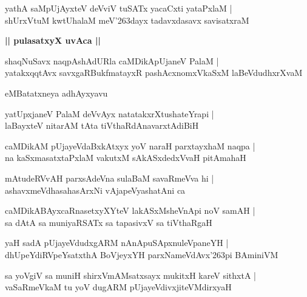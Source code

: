 \documentclass[twoside,12pt,openright]{book}
\def\S{\char'263}
\newcounter{shloka}[chapter]
\def\uvaca#1{\centerline{{\large\textbf{#1}}}}
\begin{document}
\begin{shloka}%
yathA saMpUjAyxteV deVviV tuSATx yacaCxti yataPxlaM |\\
shUrxVtuM kwtUhalaM meV\S dayx tadavxdasavx savisatxraM 
\end{shloka}

\uvaca{|| pulasatxyX uvAca ||}

\begin{shloka}%
shaqNuSavx naqpAshAdURla caMDikApUjaneV PalaM |\\
yatakxqqtAvx savxgaRBukfmatayxR pashAcxnomxVkaSxM laBeVdudhxrXvaM 
\end{shloka}

\begin{center}
eMBatatxneya adhAyxyavu
\end{center}

\begin{shloka}%
yatUpxjaneV PalaM deVvAyx natatakxrXtushateYrapi |\\
laBayxteV nitarAM tAta tiVthaRdAnavarxtAdiBiH 
\end{shloka}

\begin{shloka}%
caMDikAM pUjayeVdaBxkAtxyx yoV naraH parxtayxhaM naqpa |\\
na kaSxmasatxtaPxlaM vakutxM sAkASxdedxVvaH pitAmahaH 
\end{shloka}

\begin{shloka}%
mAtudeRVvAH parxsAdeVna sulaBaM savaRmeVva hi |\\
ashavxmeVdhasahasArxNi vAjapeVyashatAni ca
\end{shloka}

\begin{shloka}%
caMDikABAyxcaRnasetxyXYteV lakASxMsheVnApi noV samAH |\\
sa dAtA sa muniyaRSATx sa tapasivxV sa tiVthaRgaH 
\end{shloka}

\begin{shloka}%
yaH sadA pUjayeVdudxgARM nAnApuSApxnuleVpaneYH |\\
dhUpeYdiRVpeYsatxthA BoVjeyxYH parxNameVdAvx\S pi BAminiVM
\end{shloka}

\begin{shloka}%
sa yoVgiV sa muniH shirxVmAMsatxsayx mukitxH kareV sithxtA |\\
vaSaRmeVkaM tu yoV dugARM pUjayeVdivxjiteVMdirxyaH 
\end{shloka}
\end{document}
